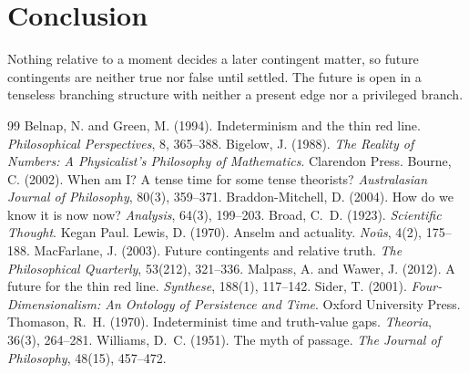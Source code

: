 \documentclass{situationist-preprint}
\begin{document}
\section{Conclusion}

Nothing relative to a moment decides a later contingent matter, so future contingents are neither true nor false until settled. The future is open in a tenseless branching structure with neither a present edge nor a privileged branch.

\begin{thebibliography}{99}\small
{} Belnap, N. and Green, M. (1994). Indeterminism and the thin red line. \emph{Philosophical Perspectives}, 8, 365--388.
 Bigelow, J. (1988). \emph{The Reality of Numbers: A Physicalist's Philosophy of Mathematics}. Clarendon Press.
 Bourne, C. (2002). When am I? A tense time for some tense theorists? \emph{Australasian Journal of Philosophy}, 80(3), 359--371.
 Braddon-Mitchell, D. (2004). How do we know it is now now? \emph{Analysis}, 64(3), 199--203.
 Broad, C.~D. (1923). \emph{Scientific Thought}. Kegan Paul.
 Lewis, D. (1970). Anselm and actuality. \emph{No\^us}, 4(2), 175--188.
 MacFarlane, J. (2003). Future contingents and relative truth. \emph{The Philosophical Quarterly}, 53(212), 321--336.
 Malpass, A. and Wawer, J. (2012). A future for the thin red line. \emph{Synthese}, 188(1), 117--142.
 Sider, T. (2001). \emph{Four-Dimensionalism: An Ontology of Persistence and Time}. Oxford University Press.
 Thomason, R.~H. (1970). Indeterminist time and truth-value gaps. \emph{Theoria}, 36(3), 264--281.
 Williams, D.~C. (1951). The myth of passage. \emph{The Journal of Philosophy}, 48(15), 457--472.
\end{thebibliography}
\end{document}
